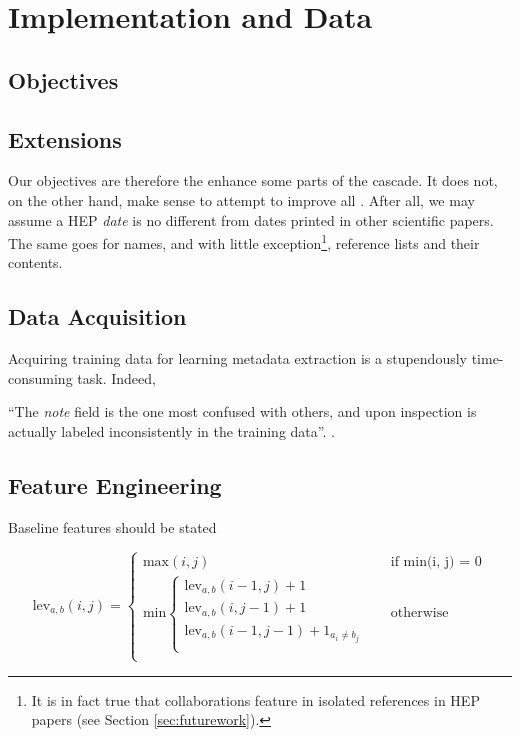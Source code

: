 
\chapter{Implementation and Data} %

\label{Chapter4} %



\section{Objectives}

\section{Extensions}

Our objectives are therefore the enhance some parts of the cascade. It does not, on the other hand, make sense to attempt to improve all . After all, we may assume a HEP \emph{date} is no different from dates printed in other scientific papers. The same goes for names, and with little exception\footnote{It is in fact true that collaborations feature in isolated references in HEP papers (see Section \ref{sec:futurework}).}, reference lists and their contents.

\section{Data Acquisition}

Acquiring training data for learning metadata extraction is a stupendously time-consuming task. Indeed, 

``The \emph{note} field is the one most confused with others, and upon inspection is actually labeled inconsistently in the training data''. \cite{Peng04accurateinformation}.

\section{Feature Engineering}

Baseline features should be stated 

\[
  \text{lev}_{a, b}(i, j) = 
  \begin{cases} 
  	\text{max}(i, j) &\quad\text{if min(i, j) = 0} \\
	\text{min}
		\begin{cases}
			\text{lev}_{a, b}(i - 1, j) + 1 \\
			\text{lev}_{a, b}(i, j - 1) + 1 \\
			\text{lev}_{a, b}(i - 1, j - 1) + 1_{a_i \neq b_j} \\
		\end{cases} &\quad\text{otherwise} \\
  \end{cases}
\]

